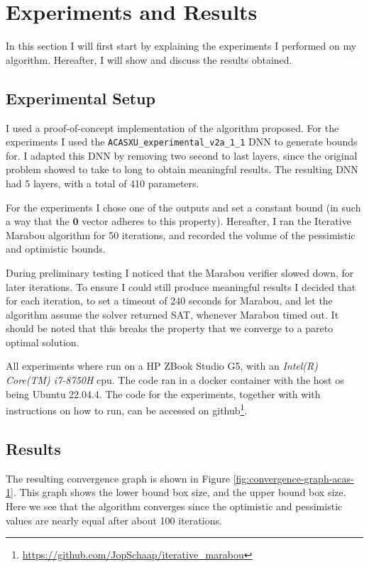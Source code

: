 \documentclass[../main.tex]{subfiles}
\begin{document}
\section{Experiments and Results}\label{sec:exper-and-results}
In this section I will first start by explaining the experiments I performed on my algorithm. Hereafter, I will show and discuss the results obtained.

\subsection*{Experimental Setup}
I used a proof-of-concept implementation of the algorithm proposed. For the experiments I used the \texttt{ACASXU\_experimental\_v2a\_1\_1} DNN\cite{julianPolicyCompressionAircraft2016} to generate bounds for. I adapted this DNN by removing two second to last layers, since the original problem showed to take to long to obtain meaningful results. The resulting DNN had 5 layers, with a total of 410 parameters.

For the experiments I chose one of the outputs and set a constant bound (in such a way that the $\bm{0}$ vector adheres to this property). Hereafter, I ran the Iterative Marabou algorithm for 50 iterations, and recorded the volume of the pessimistic and optimistic bounds.

During preliminary testing I noticed that the Marabou verifier slowed down, for later iterations. To ensure I could still produce meaningful results I decided that for each iteration, to set a timeout of 240 seconds for Marabou, and let the algorithm assume the solver returned SAT, whenever Marabou timed out. It should be noted that this breaks the property that we converge to a pareto optimal solution.

All experiments where run on a HP ZBook Studio G5, with an \textit{Intel(R) Core(TM) i7-8750H} cpu. The code ran in a docker container with the host os being Ubuntu 22.04.4. The code for the experiments, together with with instructions on how to run, can be accessed on github\footnote{\url{https://github.com/JopSchaap/iterative_marabou}}.


\subsection*{Results}
The resulting convergence graph is shown in Figure \ref{fig:convergence-graph-acas-1}. This graph shows the lower bound box size, and the upper bound box size. Here we see that the algorithm converges since the optimistic and pessimistic values are nearly equal after about 100 iterations.
\end{document}
